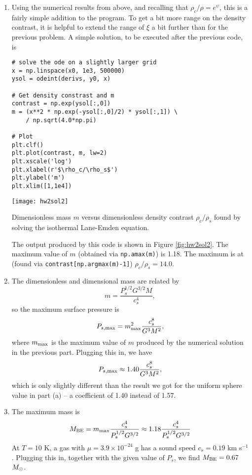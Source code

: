 \begin{enumerate}
\begin{enumerate}
\item Using the numerical results from above, and recalling that $\rho_c/\rho = e^{\psi}$, this is a fairly simple addition to the program. To get a bit more range on the density contrast, it is helpful to extend the range of $\xi$ a bit further than for the previous problem. A simple solution, to be executed after the previous code, is
\begin{verbatim}
# solve the ode on a slightly larger grid
x = np.linspace(x0, 1e3, 500000)
ysol = odeint(derivs, y0, x)

# Get density constrast and m
contrast = np.exp(ysol[:,0])
m = (x**2 * np.exp(-ysol[:,0]/2) * ysol[:,1]) \
    / np.sqrt(4.0*np.pi)

# Plot
plt.clf()
plt.plot(contrast, m, lw=2)
plt.xscale('log')
plt.xlabel(r'$\rho_c/\rho_s$')
plt.ylabel('m')
plt.xlim([1,1e4])
\end{verbatim}
\begin{marginfigure}
\texttt{[image: hw2sol2]}
\caption[Solution to problem set~\thesolutionset, problem~\theenumi\theenumii]{
\label{fig:hw2sol2}
Dimensionless mass $m$ versus dimensionless density contrast $\rho_c/\rho_s$ found by solving the isothermal Lane-Emden equation.
}
\end{marginfigure}
The output produced by this code is shown in Figure \ref{fig:hw2sol2}. The maximum value of $m$ (obtained via \verb=np.amax(m)=) is 1.18. The maximum is at (found via \verb=contrast[np.argmax(m)-1]=) $\rho_c/\rho_s = 14.0$.

\item The dimensionless and dimensional mass are related by
\begin{displaymath}
m = \frac{P_s^{1/2} G^{3/2} M}{c_s^4},
\end{displaymath}
so the maximum surface pressure is
\begin{displaymath}
P_{s,\rm max} = m_{\rm max}^2 \frac{c_s^8}{G^3 M^2},
\end{displaymath}
where $m_{\rm max}$ is the maximum value of $m$ produced by the numerical solution in the previous part. Plugging this in, we have
\begin{displaymath}
P_{s,\rm max} \approx 1.40 \frac{c_s^8}{G^3 M^2},
\end{displaymath}
which is only slightly different than the result we got for the uniform sphere value in part (a) -- a coefficient of 1.40 instead of 1.57.

\item The maximum mass is
\begin{displaymath}
M_{\rm BE} = m_{\rm max} \frac{c_s^4}{P_s^{1/2} G^{3/2}} \approx 1.18  \frac{c_s^4}{P_s^{1/2} G^{3/2}}
\end{displaymath}
At $T = 10$ K, a gas with $\mu=3.9\times 10^{-24}$ g has a sound speed $c_s = 0.19$ km s$^{-1}$. Plugging this in, together with the given value of $P_s$, we find $M_{\rm BE} = 0.67$ $M_{\odot}$.


\end{enumerate}
\end{enumerate}
